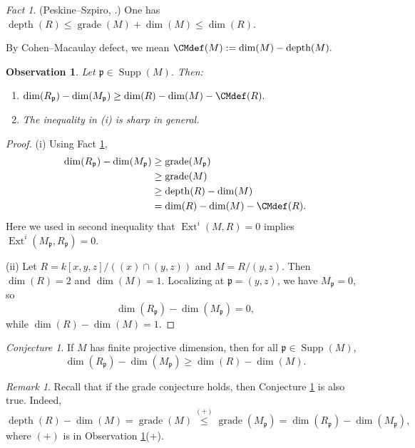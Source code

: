 \documentclass[11.05pt,a4paper]{amsart}
\newtheorem{observation}[theorem]{Observation}\newcommand{\up}[1]{{{}^{#1}\!}}
\theoremstyle{definition}
\theoremstyle{remark}
\newtheorem{remark}[theorem]{Remark}\newtheorem{fact}[theorem]{Fact}
\newtheorem{conjecture}[theorem]{Conjecture}
\newcommand{\grade}{\operatorname{grade}}
\newcommand{\Ext}{\operatorname{Ext}}
\newcommand{\Supp}{\operatorname{Supp}}
\newcommand{\depth}{\operatorname{depth}}
\begin{document}
\begin{fact}\label{psg}
	(Peskine–Szpiro, \cite[Lemma II.1.4.8]{PS}.) One has
	\(
	\depth(R) \le \grade(M) + \dim(M) \le \dim(R).
	\)
\end{fact}

By Cohen–Macaulay defect, we mean
\(
\CMdef(M) := \dim(M) - \depth(M).
\)

\begin{observation}\label{4.3}
	Let $\mathfrak{p} \in \Supp(M)$. Then:
	
	\begin{enumerate}
		\item[(i)] 
		\(
		\dim(R_{\mathfrak{p}}) - \dim(M_{\mathfrak{p}})
		\ge \dim(R) - \dim(M) - \CMdef(R).
		\)
		
		\item[(ii)] The inequality in (i) is sharp in general.
	\end{enumerate}
\end{observation}

\begin{proof}
	(i) Using Fact \ref{psg},
	\begin{align*}
	\dim(R_{\mathfrak{p}}) - \dim(M_{\mathfrak{p}})
	&\ge \grade(M_{\mathfrak{p}}) \\
	&\ge \grade(M) \\
	&\ge \depth(R) - \dim(M) \\
	&= \dim(R) - \dim(M) - \CMdef(R).
	\end{align*}
	Here we used in second inequality that $\Ext^i(M,R)=0$ implies $\Ext^i(M_{\mathfrak{p}},R_{\mathfrak{p}})=0$.
	
	(ii) Let $R = k[x,y,z]/((x)\cap(y,z))$ and $M = R/(y,z)$. Then
	$\dim(R)=2$ and $\dim(M)=1$. Localizing at $\mathfrak{p}=(y,z)$, we have
	$M_{\mathfrak{p}}=0$, so
	\[
	\dim(R_{\mathfrak{p}}) - \dim(M_{\mathfrak{p}}) = 0,
	\]
	while $\dim(R)-\dim(M)=1$.
\end{proof}

\begin{conjecture}\label{4.4}
	If $M$ has finite projective dimension, then for all $\mathfrak{p} \in \Supp(M)$,
	\[
	\dim(R_{\mathfrak{p}}) - \dim(M_{\mathfrak{p}})
	\ge \dim(R) - \dim(M).
	\]
\end{conjecture}


\begin{remark}
Recall that if the grade conjecture holds, then {Conjecture} \ref{4.4} is also true. Indeed, \[
\depth(R) - \dim( M) = \grade(M) \stackrel{(+)}\leq \grade(M_{\mathfrak{p}})  =\dim (R_{\mathfrak{p}}) - \dim (M_{\mathfrak{p}}),
\]where $(+)$  is in Observation \ref{4.3}(+).
\end{remark}
\end{document}
